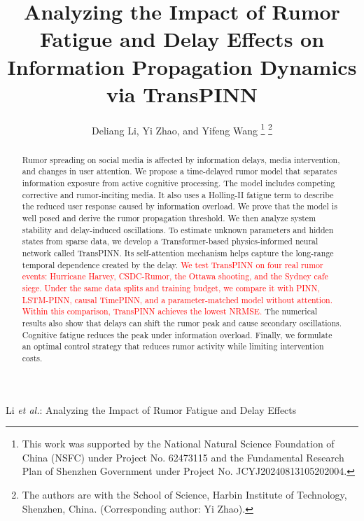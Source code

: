 \documentclass[letterpaper,journal]{IEEEtran}
\begin{document}
		
	
	\title{Analyzing the Impact of Rumor Fatigue and Delay Effects on Information Propagation Dynamics via TransPINN}
	
	\author{Deliang Li, Yi Zhao, and Yifeng Wang
		\thanks{This work was supported by the National Natural Science Foundation of China (NSFC) under Project No. 62473115 and the Fundamental Research Plan of Shenzhen Government under Project No. JCYJ20240813105202004.}
		\thanks{The authors are with the School of Science, Harbin Institute of Technology, Shenzhen, China. (Corresponding author: Yi Zhao).}}
	
	{Li \MakeLowercase{\textit{et al.}}: Analyzing the Impact of Rumor Fatigue and Delay Effects}
	
	\maketitle
	\linenumbers
	
	\begin{abstract}
		Rumor spreading on social media is affected by information delays, media intervention, and changes in user attention. 
		We propose a time-delayed rumor model that separates information exposure from active cognitive processing. 
		The model includes competing corrective and rumor-inciting media. 
		It also uses a Holling-II fatigue term to describe the reduced user response caused by information overload. 
		We prove that the model is well posed and derive the rumor propagation threshold. 
		We then analyze system stability and delay-induced oscillations. 
		To estimate unknown parameters and hidden states from sparse data, 
		we develop a Transformer-based physics-informed neural network called TransPINN. 
		Its self-attention mechanism helps capture the long-range temporal dependence created by the delay. 
		\textcolor{red}{We test TransPINN on four real rumor events: Hurricane Harvey, CSDC-Rumor, the Ottawa shooting, and the Sydney cafe siege. Under the same data splits and training budget, we compare it with PINN, LSTM-PINN, causal TimePINN, and a parameter-matched model without attention. Within this comparison, TransPINN achieves the lowest NRMSE.  } 
		The numerical results also show that delays can shift the rumor peak and cause secondary oscillations. Cognitive fatigue reduces the peak under information overload. Finally, we formulate an optimal control strategy that reduces rumor activity while limiting intervention costs.
	\end{abstract}
	
\end{document}
